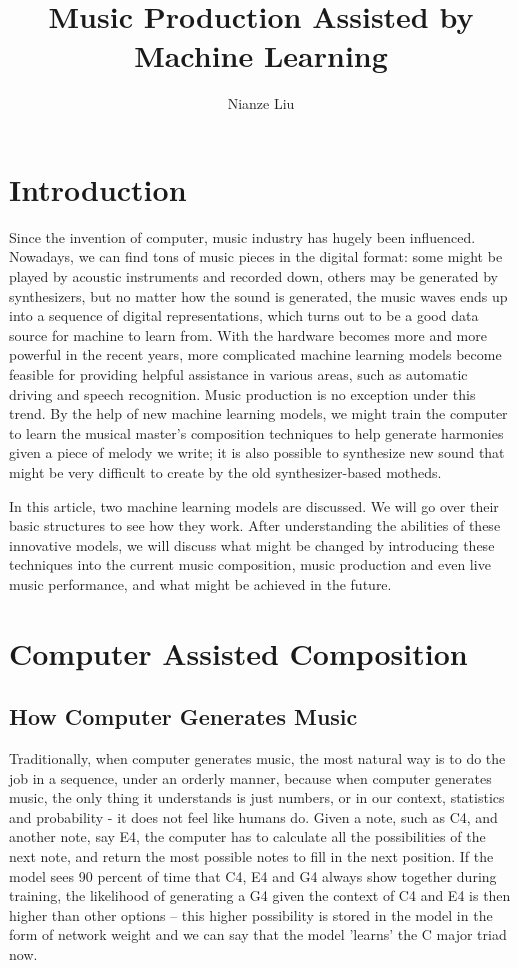 \documentclass[jou]{apa6}
\title{Music Production Assisted by Machine Learning}
\author{Nianze Liu}
\affiliation{New York University}
\begin{document}
\maketitle

\section{Introduction}

Since the invention of computer, music industry has hugely been influenced. Nowadays, we can find tons of music pieces in the digital format: some might be played by acoustic instruments and recorded down, others may be generated by synthesizers, but no matter how the sound is generated, the music waves ends up into a sequence of digital representations, which turns out to be a good data source for machine to learn from. With the hardware becomes more and more powerful in the recent years, more complicated machine learning models become feasible for providing helpful assistance in various areas, such as automatic driving and speech recognition. Music production is no exception under this trend. By the help of new machine learning models, we might train the computer to learn the musical master's composition techniques to help generate harmonies given a piece of melody we write; it is also possible to synthesize new sound that might be very difficult to create by the old synthesizer-based motheds.

In this article, two machine learning models are discussed. We will go over their basic structures to see how they work. After understanding the abilities of these innovative models, we will discuss what might be changed by introducing these techniques into the current music composition, music production and even live music performance, and what might be achieved in the future.

\section{Computer Assisted Composition}

\subsection{How Computer Generates Music}

Traditionally, when computer generates music, the most natural way is to do the job in a sequence, under an orderly manner, because when computer generates music, the only thing it understands is just numbers, or in our context, statistics and probability - it does not feel like humans do. Given a note, such as C4, and another note, say E4, the computer has to calculate all the possibilities of the next note, and return the most possible notes to fill in the next position. If the model sees 90 percent of time that C4, E4 and G4 always show together during training, the likelihood of generating a G4 given the context of C4 and E4 is then higher than other options -- this higher possibility is stored in the model in the form of network weight and we can say that the model 'learns' the C major triad now. 
\end{document}
